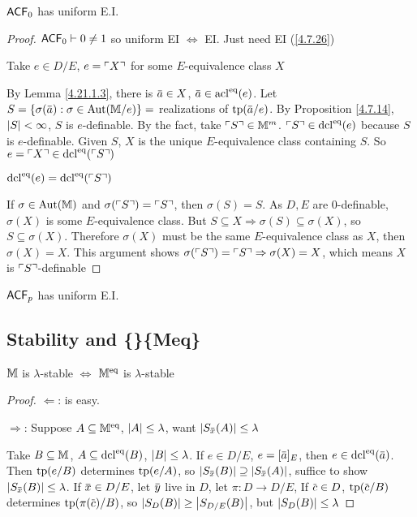 \documentclass[11pt]{article}
\begin{document}
\begin{theorem}[]
\(\textsf{ACF}_0\) has uniform E.I.
\end{theorem}

\begin{proof}
\(\textsf{ACF}_0\vdash 0\neq 1\) so uniform EI \(\Leftrightarrow\) EI. Just need EI (\ref{4.7.26})

Take \(e\in D/E\), \(e=\ulcorner X \urcorner\) for some \(E\)-equivalence class \(X\)

By Lemma \ref{4.21.1.3}, there is \(\bara\in X\), \(\bara\in\acl^{\eq}(e)\).
Let \(S=\{\sigma(\bara):\sigma\in\Aut(\M/e)\}=\) realizations of \(\tp(\bara/e)\). By Proposition
\ref{4.7.14}, \(\abs{S}<\infty\), \(S\) is \(e\)-definable. By the fact, take \(\ulcorner S \urcorner\in\mathbb{M}^m\).
\(\ulcorner S \urcorner\in\operatorname{dcl}^{\operatorname{eq}}(e)\) because \(S\) is \(e\)-definable.
Given \(S\), \(X\) is the unique \(E\)-equivalence class containing \(S\).
So \(e=\ulcorner X \urcorner\in\operatorname{dcl}^{\operatorname{eq}}(\ulcorner S \urcorner)\)

\(\operatorname{dcl}^{\operatorname{eq}}(e)=\operatorname{dcl}^{\operatorname{eq}}(\ulcorner S \urcorner)\)

If \(\sigma\in\operatorname{\text{Aut}}(\mathbb{M})\) and \(\sigma(\ulcorner S \urcorner)=\ulcorner S \urcorner\), then \(\sigma(S)=S\).  As \(D,E\) are
0-definable, \(\sigma(X)\) is some \(E\)-equivalence class. But \(S\subseteq X\Rightarrow\sigma(S)\subseteq\sigma(X)\), so \(S\subseteq\sigma(X)\).
Therefore \(\sigma(X)\) must be the same \(E\)-equivalence class as \(X\), then \(\sigma(X)=X\). This
argument shows \(\sigma(\ulcorner S \urcorner)=\ulcorner S \urcorner\Rightarrow\sigma(X)=X\), which means \(X\) is \(\ulcorner S \urcorner\)-definable
\end{proof}

\begin{fact}[]
\(\textsf{ACF}_p\) has uniform E.I.
\end{fact}
\subsection{Stability and \texorpdfstring\{\(\M^{\eq}\)\}\{Meq\}}
\label{sec:orgce7664f}
\begin{theorem}[]
\(\mathbb{M}\) is \(\lambda\)-stable \(\Leftrightarrow\) \(\M^{\eq}\) is \(\lambda\)-stable
\end{theorem}

\begin{proof}
\(\Leftarrow\): is easy.

\(\Rightarrow\): Suppose \(A\subseteq\mathbb{M}^{\operatorname{eq}}\), \(\abs{A}\le\lambda\), want \(\abs{S_{\barx}(A)}\le\lambda\)

Take \(B\subseteq\mathbb{M}\), \(A\subseteq\operatorname{dcl}^{\operatorname{eq}}(B)\), \(\abs{B}\le\lambda\). If \(e\in D/E\), \(e=[\bara]_E\),
then \(e\in\dcl^{\eq}(\bara)\). Then \(\operatorname{tp}(e/B)\)
determines \(\operatorname{tp}(e/A)\), so \(\abs{S_{\barx}(B)}\supseteq\abs{S_{\barx}(A)}\), suffice to
show \(\abs{S_{\barx}(B)}\le\lambda\). If \(\barx\in D/E\), let \(\bary\) live in \(D\), let \(\pi:D\to D/E\),
If \(\barc\in D\), \(\tp(\barc/B)\) determines \(\tp(\pi(\barc)/B)\),
so \(\abs{S_D(B)}\ge\abs{S_{D/E}(B)}\), but \(\abs{S_D(B)}\le\lambda\)
\end{proof}
\end{document}

